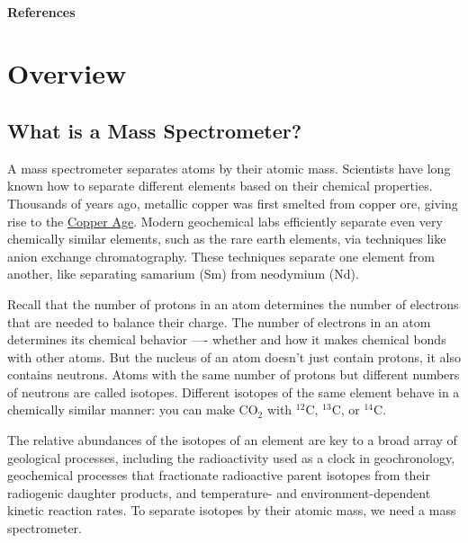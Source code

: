 \documentclass[
  letterpaper,
  DIV=11,
  numbers=noendperiod]{scrreprt}
\newlength{\cslhangindent}
\newenvironment{CSLReferences}[2] %
 {\begin{list}{}{%
  \setlength{\itemindent}{0pt}
  \setlength{\leftmargin}{0pt}
  \setlength{\parsep}{0pt}
  \ifodd #1
   \setlength{\leftmargin}{\cslhangindent}
   \setlength{\itemindent}{-1\cslhangindent}
  \fi
  \setlength{\itemsep}{#2\baselineskip}}}
 {\end{list}}
\begin{document}
\subsubsection{References}\label{references}

\label{refs}
\begin{CSLReferences}{0}{1}
\end{CSLReferences}

\chapter{Overview}\label{overview}

\section{What is a Mass
Spectrometer?}\label{what-is-a-mass-spectrometer}

A mass spectrometer separates atoms by their atomic mass. Scientists
have long known how to separate different elements based on their
chemical properties. Thousands of years ago, metallic copper was first
smelted from copper ore, giving rise to the
\href{https://en.wikipedia.org/wiki/Chalcolithic}{Copper Age}. Modern
geochemical labs efficiently separate even very chemically similar
elements, such as the rare earth elements, via techniques like anion
exchange chromatography. These techniques separate one element from
another, like separating samarium (Sm) from neodymium (Nd).

Recall that the number of protons in an atom determines the number of
electrons that are needed to balance their charge. The number of
electrons in an atom determines its chemical behavior ---- whether and
how it makes chemical bonds with other atoms. But the nucleus of an atom
doesn't just contain protons, it also contains neutrons. Atoms with the
same number of protons but different numbers of neutrons are called
isotopes. Different isotopes of the same element behave in a chemically
similar manner: you can make CO\(_{2}\) with \(^{12}\)C, \(^{13}\)C, or
\(^{14}\)C.

The relative abundances of the isotopes of an element are key to a broad
array of geological processes, including the radioactivity used as a
clock in geochronology, geochemical processes that fractionate
radioactive parent isotopes from their radiogenic daughter products, and
temperature- and environment-dependent kinetic reaction rates. To
separate isotopes by their atomic mass, we need a mass spectrometer.
\end{document}
